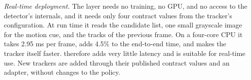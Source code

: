 \emph{Real-time deployment.} The layer needs no training, no GPU, and no
access to the detector's internals, and it needs only four contract values
from the tracker's configuration. At run time it reads the candidate list, one
small grayscale image for the motion cue, and the tracks of the previous
frame. On a four-core CPU it takes 2.95 ms per frame, adds 4.5\% to the end-to-end time, and makes the tracker
itself faster. \scl{} therefore adds very little latency and is
suitable for real-time use. New trackers are added through their published
contract values and an adapter, without changes to the policy.
